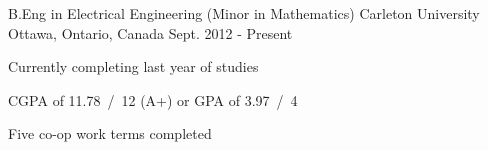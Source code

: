 

\begin{cventries}

  \cventry
    {B.Eng in Electrical Engineering (Minor in Mathematics)} %
    {Carleton University} %
    {Ottawa, Ontario, Canada} %
    {Sept. 2012 - Present} %
    {
      \begin{cvitems} %
        \item {Currently completing last year of studies}
        \item {CGPA of 11.78~/~12 (A+) or GPA of 3.97~/~4}
        \item {Five co-op work terms completed}
      \end{cvitems}
    }

\end{cventries}
